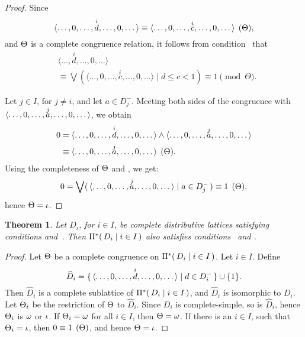 \documentclass{amsart}
\theoremstyle{plain}
\newtheorem{theorem}{Theorem}
\theoremstyle{definition}
\theoremstyle{remark}
\numberwithin{equation}{section}
\newcommand{\Prodsm}[2]{\GrP^{*}(\,#1\mid#2\,)}
\newcommand{\vectsup}[2]{\vect<\dots,0,\dots,\overset{#1}{#2},%
\dots,0,\dots>}%
\begin{document}
\begin{proof}  
   Since 
   \begin{equation}\label{E:cong2}
      \congr\vectsup{i}{d}=\vectsup{i}{c}(\GrQ), 
   \end{equation}
   and $\Theta$ is a complete congruence relation, it follows 
   from condition~ that
   \begin{equation}\label{E:cong}
   \begin{split}
       &\langle \dots, \overset{i}{d}, \dots, 0,
        \dots \rangle\\
       &\equiv \bigvee ( \langle \dots, 0, \dots, 
        \overset{i}{c},\dots, 0,\dots \rangle \mid d \leq c < 1) 
         \equiv 1 \pmod{\Theta}. 
   \end{split}
   \end{equation}

   Let $j \in I$, for $j \neq i$, and let 
   $a \in D_{j}^{-}$. Meeting both sides of the congruence
    with $\vectsup{j}{a}$, we obtain
   \begin{equation}\label{E:comp}
      \begin{split}
          0 &= \vectsup{i}{d} \mm \vectsup{j}{a}\\
            &\equiv \vectsup{j}{a}\pod{\GrQ}.
     \end{split} 
   \end{equation}
  Using the completeness of $\Theta$ and , we get:
   \begin{equation}\label{E:cong3}
       \congr{0=\JJm{ \vectsup{j}{a} }{ a \in D_{j}^{-} }}={1}(\GrQ), 
   \end{equation}
   hence $\Theta = \iota$.
\end{proof}

\begin{theorem}\label{T:P*a}  
   Let $D_{i}$, for $i \in I$, be complete distributive 
   lattices satisfying
   conditions  and~. Then 
   $\Prodsm{ D_{i} }{i \in I}$ also satisfies 
   conditions~ and . 
\end{theorem}

\begin{proof}
   Let $\Theta$ be a complete congruence on 
   $\Prodsm{ D_{i} }{i \in I}$. Let $i \in I$. Define 
   \begin{equation}\label{E:dihat}
      \widehat{D}_{i} = \setm{ \vectsup{i}{d} }{ d \in D_{i}^{-} } 
       \uu \set{1}.
   \end{equation}
   Then $\widehat{D}_{i}$ is a complete sublattice of 
   $\Prodsm{ D_{i} }{i \in I}$, and $\widehat{D}_{i}$  
   is isomorphic to $D_{i}$. Let $\Theta_{i}$ be the 
   restriction of $\Theta$ to $\widehat{D}_{i}$. Since
   $D_{i}$ is complete-simple, so is $\widehat{D}_{i}$,
   hence $\Theta_{i}$ is $\omega$ or $\iota$. If $\Theta_{i} = \omega$ 
   for all $i \in I$, then $\Theta = \omega$. 
   If there is an $i \in I$, such that $\Theta_{i} = \iota$, 
   then $\congr0=1(\GrQ)$, and hence $\Theta = \iota$. 
\end{proof}
\end{document}
